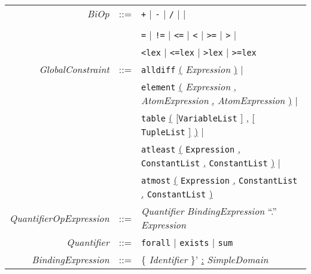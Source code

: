 \documentclass{article}
\begin{document}
\begin{tabular}{rcl}
\textit{BiOp} & ::= & {\tt +} $\mid$ {\tt -}  $\mid$ {\tt /}  $\mid$ {\tt *}  $\mid$  \verb1^1  $\mid$ \\
              &     &  \verb1\/1  $\mid$ \verb1/\1  $\mid$ {\tt =>}  $\mid$ {\tt <=>}  $\mid$ \\
              &     & {\tt =}  $\mid$ {\tt !=}  $\mid$ {\tt <=}  $\mid$ {\tt <}  $\mid$ {\tt >=}  $\mid$ {\tt >} $\mid$ \\
              &     & {\tt <lex} $\mid$ {\tt <=lex} $\mid$ {\tt >lex} $\mid$ {\tt >=lex} \\
\textit{GlobalConstraint} & ::= & \texttt{alldiff}  \underline{(} \textit{Expression}  \underline{)} $\mid$ \\
                              &     & \texttt{element}  \underline{(}
                              \textit{Expression}  \underline{,}
                               \textit{AtomExpression}  \underline{,}
                              \textit{AtomExpression}  \underline{)}  $\mid$\\  
      &     &  \texttt{table} \underline{(} \underline{[}\texttt{VariableList}  \underline{]} 
                 \underline{,} \underline{[} \texttt{TupleList} \underline{]} \underline{)} $\mid$ \\ 
      &     &  \texttt{atleast} \underline{(}  \texttt{Expression}   \underline{,} \texttt{ConstantList}  \underline{,}  \texttt{ConstantList}  \underline{)} $\mid$ \\ 
&     &  \texttt{atmost}  \underline{(}  \texttt{Expression} \underline{,} \texttt{ConstantList} \underline{,}  \texttt{ConstantList}  \underline{)} \\


 \textit{QuantifierOpExpression} & ::= & \textit{Quantifier} \textit{BindingExpression} ``.'' \textit{Expression} \\
\textit{Quantifier} & ::= & \texttt{forall} $\mid$ \texttt{exists} $\mid$ \texttt{sum} \\ 
\textit{BindingExpression} & ::= & \{ \textit{Identifier} \}' \underline{:} \textit{SimpleDomain} \\




\end{tabular}
\end{document}
